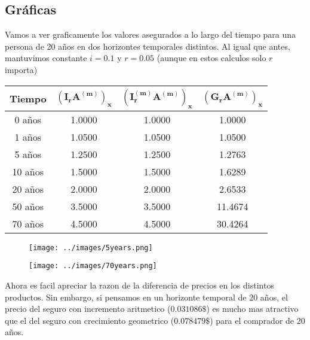 \subsection{Gráficas}

Vamos a ver graficamente los valores asegurados a lo largo del tiempo para una persona de 20 años en dos horizontes temporales distintos. Al igual que antes, mantuvimos constante $i=0.1$ y $r = 0.05$ (aunque en estos calculos solo $r$ importa)

\begin{center}
    \begin{tabular}{|c|c|c|c|}
        \hline
        \textbf{Tiempo} & $\mathbf{(I_rA^{(m)})_x}$ & $\mathbf{(I^{(m)}_rA^{(m)})_x}$ & $\mathbf{(G_rA^{(m)})_x}$ \\
        \hline
        0 años   & 1.0000 & 1.0000 & 1.0000  \\
        1 años   & 1.0500 & 1.0500 & 1.0500  \\
        5 años   & 1.2500 & 1.2500 & 1.2763  \\
        10 años  & 1.5000 & 1.5000 & 1.6289  \\
        20 años  & 2.0000 & 2.0000 & 2.6533  \\
        50 años  & 3.5000 & 3.5000 & 11.4674 \\
        70 años  & 4.5000 & 4.5000 & 30.4264 \\
        \hline
    \end{tabular}
\end{center}

\begin{figure}[H]
    \centering
    \texttt{[image: ../images/5years.png]}
\end{figure}

\begin{figure}[H]
    \centering
    \texttt{[image: ../images/70years.png]}
\end{figure}

Ahora es facil apreciar la razon de la diferencia de precios en los distintos productos. Sin embargo, si pensamos en un horizonte temporal de 20 años, el precio del seguro con incremento aritmetico ($0.031086\$$) es mucho mas atractivo que el del seguro con crecimiento geometrico ($0.078479\$$) para el comprador de 20 años. 

